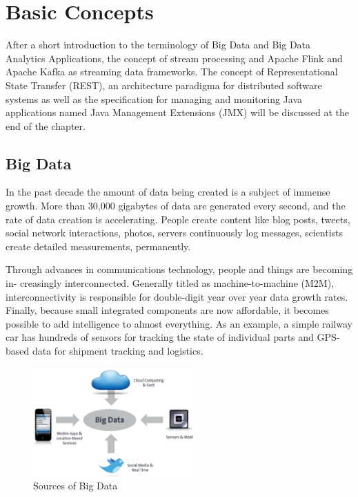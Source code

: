 \chapter{Basic Concepts}
After a short introduction to the terminology of Big Data and Big Data Analytics Applications, the concept of
stream processing and Apache Flink and Apache Kafka as streaming data frameworks. The concept of Representational
State Transfer (REST), an architecture paradigma for distributed software systems as well as the specification for
managing and monitoring Java applications named Java Management Extensions (JMX) will be discussed at the end of
the chapter.

\section{Big Data}
In the past decade the amount of data being created is a subject of immense growth.
More than 30,000 gigabytes of data are generated every second, and the rate of data
creation is accelerating\cite{Marz15}. People create content like blog posts, tweets, social
network interactions, photos, servers continuously log messages, scientists create detailed
measurements, permanently.

Through advances in communications technology, people and things are becoming in-
creasingly interconnected. Generally titled as machine-to-machine (M2M), interconnectivity is
responsible for double-digit year over year data growth rates. Finally,
because small integrated components are now affordable, it becomes possible to add
intelligence to almost everything. As an example, a simple railway car has hundreds
of sensors for tracking the state of individual parts and GPS-based data for shipment
tracking and logistics\cite{Ziko12}.

\begin{figure}[H]
	\centering
	\includegraphics[width=0.55\textwidth]{../images/04-sources-of-bigdata.png}
	\caption{Sources of Big Data{\cite{Bitk12}}}
	\label{sources-of-bigdata}
\end{figure}

